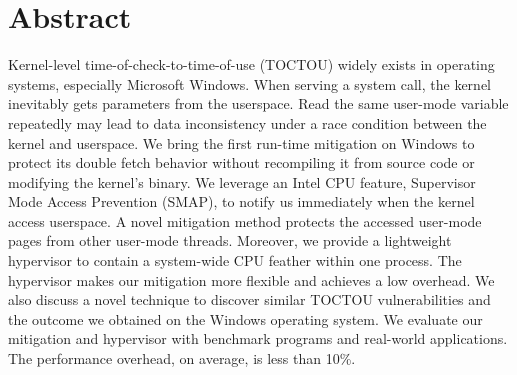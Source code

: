 \section{Abstract}


Kernel-level time-of-check-to-time-of-use (TOCTOU) widely exists in operating systems, especially Microsoft Windows. When serving a system call, the kernel inevitably gets parameters from the userspace. Read the same user-mode variable repeatedly may lead to data inconsistency under a race condition between the kernel and userspace. We bring the first run-time mitigation on Windows to protect its double fetch behavior without recompiling it from source code or modifying the kernel's binary. We leverage an Intel CPU feature, Supervisor Mode Access Prevention (SMAP), to notify us immediately when the kernel access userspace. A novel mitigation method protects the accessed user-mode pages from other user-mode threads.
Moreover, we provide a lightweight hypervisor to contain a system-wide CPU feather within one process. The hypervisor makes our mitigation more flexible and achieves a low overhead. We also discuss a novel technique to discover similar TOCTOU vulnerabilities and the outcome we obtained on the Windows operating system. We evaluate our mitigation and hypervisor with benchmark programs and real-world applications. The performance overhead, on average, is less than 10\%.
